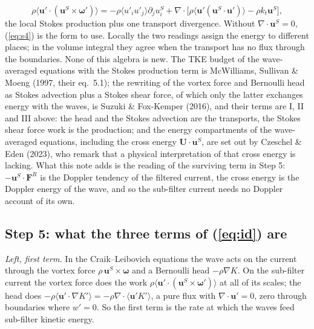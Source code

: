 \documentclass[10pt]{article}
\newcommand{\av}[1]{\langle #1\rangle}\newcommand{\uS}{\bm u^S}\newcommand{\WS}{\mathcal W_S}\newcommand{\PS}{\mathcal P_S}
\newcommand{\bu}{\bm u}\newcommand{\bU}{\bm U}\newcommand{\bxi}{\bm\xi}\newcommand{\dd}{\mathrm d}
\begin{document}
\[
\rho\av{\bu'\cdot(\uS\times\bm\omega')}=-\rho\av{u'_iu'_j}\partial_ju^S_i+\nabla\cdot\big[\rho\av{\bu'(\uS\!\cdot\bu')}-\rho k_t\uS\big],
\]
the local Stokes production plus one transport divergence. Without $\nabla\cdot\uS=0$, (\ref{eq:s4}) is the form to use. Locally the two readings assign the energy to different places; in the volume integral they agree when the transport has no flux through the boundaries. None of this algebra is new. The TKE budget of the wave-averaged equations with the Stokes production term is McWilliams, Sullivan \& Moeng (1997, their eq.~5.1); the rewriting of the vortex force and Bernoulli head as Stokes advection plus a Stokes shear force, of which only the latter exchanges energy with the waves, is Suzuki \& Fox-Kemper (2016), and their terms are I, II and III above: the head and the Stokes advection are the transports, the Stokes shear force work is the production; and the energy compartments of the wave-averaged equations, including the cross energy $\bU\!\cdot\uS$, are set out by Czeschel \& Eden (2023), who remark that a physical interpretation of that cross energy is lacking. What this note adds is the reading of the surviving term in Step 5: $-\uS\!\cdot\bm F^R$ is the Doppler tendency of the filtered current, the cross energy is the Doppler energy of the wave, and so the sub-filter current needs no Doppler account of its own.

\subsection{Step 5: what the three terms of (\ref{eq:id}) are}
\emph{Left, first term.} In the Craik--Leibovich equations the wave acts on the current through the vortex force $\rho\,\uS\times\bm\omega$ and a Bernoulli head $-\rho\nabla K$. On the sub-filter current the vortex force does the work $\rho\av{\bu'\cdot(\uS\times\bm\omega')}$ at all of its scales; the head does $-\rho\av{\bu'\cdot\nabla K'}=-\rho\nabla\cdot\av{\bu'K'}$, a pure flux with $\nabla\cdot\bu'=0$, zero through boundaries where $w'=0$. So the first term is the rate at which the waves feed sub-filter kinetic energy.
\end{document}

